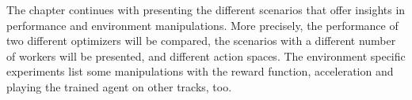 The chapter continues with presenting the different scenarios that offer insights in performance and environment manipulations. More precisely, the performance of two different optimizers will be compared, the scenarios with a different number of workers will be presented, and different action spaces. The environment specific experiments list some manipulations with the reward function, acceleration and playing the trained agent on other tracks, too.








